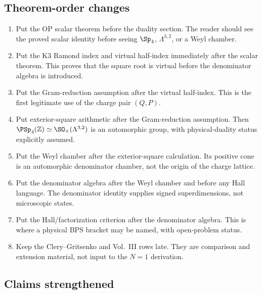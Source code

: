 \subsection{Theorem-order changes}

\begin{enumerate}
\item Put the OP scalar theorem before the duality section.  The reader
should see the proved scalar identity before seeing \(\Sp_4\),
\(\Lambda^{3,2}\), or a Weyl chamber.
\item Put the K3 Ramond index and virtual half-index immediately after
the scalar theorem.  This proves that the square root is virtual before
the denominator algebra is introduced.
\item Put the Gram-reduction assumption after the virtual half-index.
This is the first legitimate use of the charge pair \((Q,P)\).
\item Put exterior-square arithmetic after the Gram-reduction assumption.
Then \(\PSp_4(\mathbb Z)\simeq\SO_+(\Lambda^{3,2})\) is an automorphic
group, with physical-duality status explicitly assumed.
\item Put the Weyl chamber after the exterior-square calculation.  Its
positive cone is an automorphic denominator chamber, not the origin of
the charge lattice.
\item Put the denominator algebra after the Weyl chamber and before any
Hall language.  The denominator identity supplies signed
superdimensions, not microscopic states.
\item Put the Hall/factorization criterion after the denominator algebra.
This is where a physical BPS bracket may be named, with open-problem
status.
\item Keep the Clery--Gritsenko and Vol.~III rows late.  They are
comparison and extension material, not input to the \(N=1\) derivation.
\end{enumerate}

\subsection{Claims strengthened}

